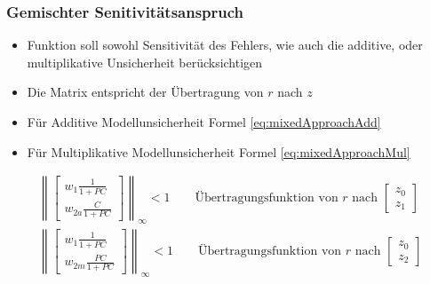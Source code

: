 \subsubsection{Gemischter Senitivitätsanspruch}
\begin{itemize}
	\item Funktion soll sowohl Sensitivität des Fehlers, wie auch die additive, oder multiplikative Unsicherheit berücksichtigen
	\item Die Matrix entspricht der Übertragung von $r$ nach $z$
	\item Für Additive Modellunsicherheit Formel \ref{eq:mixedApproachAdd}
	\item Für Multiplikative Modellunsicherheit Formel \ref{eq:mixedApproachMul}
\end{itemize}
\begin{align}
	\label{eq:mixedApproachAdd}
	\left\lVert\begin{bmatrix}
		w_1\frac{1}{1+PC}\\
		w_{2a}\frac{C}{1+PC}
	\end{bmatrix}\right\rVert_\infty <1 \qquad \text{Übertragungsfunktion von }r\text{ nach } \begin{bmatrix}
		z_0\\z_1
	\end{bmatrix}\\
		\label{eq:mixedApproachMul}
	\left\lVert\begin{bmatrix}
	w_1\frac{1}{1+PC}\\
	w_{2m}\frac{PC}{1+PC}
	\end{bmatrix}\right\rVert_\infty <1 \qquad \text{Übertragungsfunktion von }r\text{ nach } \begin{bmatrix}
	z_0\\z_2
	\end{bmatrix}
\end{align}

